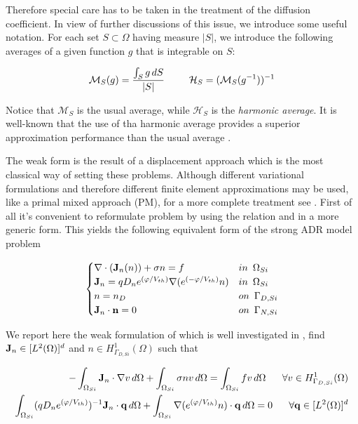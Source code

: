 Therefore special care has to be taken in the treatment of the diffusion coefficient. In view of further discussions of this issue, we introduce some useful notation. For each set $S \subset \Omega$ having measure $|S|$, we introduce the following averages of a given function $g$ that is integrable on $S$:

\begin{equation*}
\mathcal{M}_S(g) = \dfrac{\int_S g \, dS}{|S|} \psp{15} \mathcal{H}_S = (\mathcal{M}_S(g^{-1}))^{-1} 
\end{equation*}

Notice that $\mathcal{M}_S$ is the usual average, while $\mathcal{H}_S$ is the \textit{harmonic average}. It is well-known that the use of tha harmonic average provides a superior approximation performance than the usual average \cite{BabuskaMixMet}.


The weak form   is the result of a displacement approach which is the most classical way of setting these problems.
Although different variational formulations and therefore different finite element approximations may be used, like a primal mixed approach (PM), for a more complete treatment see \cite{TesiDotDeFalco}.  First of all it's convenient to reformulate problem  by using the relation  and  in a more generic form. This yields the following equivalent form of the strong ADR model problem 

\begin{equation}
\label{eq: LEC system slotboom generic}
\begin{cases}
\nabla \cdot (\vect{J}_n(n) ) +\sigma n = f & in \psp{3} \Omega_{Si}
 \\
 \vect{J}_n = qD_n e^{(\varphi/V_{th})} \nabla (e^{(-\varphi/V_{th})}n) & in \psp{3} \Omega_{Si}\\
n = n_D & on \psp{3} \Gamma_{D,Si}
 \\
 \vect{J}_n \cdot \vect{n} = 0 & on \psp{3} \Gamma_{N,Si}
\end{cases}
\end{equation}

We report here the weak formulation of  which is well investigated in \cite{TesiDotDeFalco}, find $\mathbf{J}_n \in [L^2(\Omega)]^d$ and $n \in H^1_{\Gamma_{D,Si}}(\Omega)$ such that

\begin{align}
- \int_{\Omega_{Si}} \vect{J}_n\cdot \nabla v \, d\Omega + \int_{\Omega_{Si}} \sigma n v \, d\Omega = \int_{\Omega_{Si}} f v \, d\Omega \psp{10} \forall v \in H^1_{\Gamma_{D,Si}}(\Omega)
\label{eq: weak form PM1} \\
\int_{\Omega_{Si}} (qD_n e^{(\varphi/V_{th})})^{-1} \vect{J}_n\cdot \vect{q} \, d\Omega + \int_{\Omega_{Si}} \nabla(e^{(\varphi/V_{th})}n) \cdot \vect{q} \, d\Omega = 0 \psp{10} \forall \vect{q} \in [L^2(\Omega)]^d \label{eq: weak form PM2} 
\end{align}

